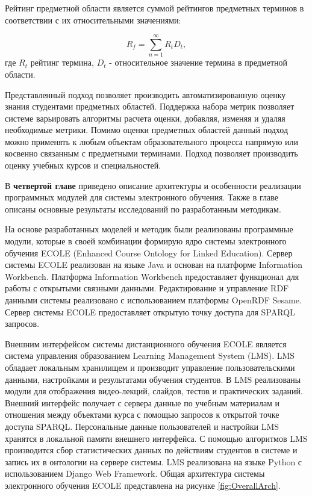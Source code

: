 Рейтинг предметной области является суммой рейтингов предметных терминов в соответствии с их относительными значениями:

$$
    R_f = \sum_{n=1}^{\infty} R_tD_t,
$$
где \(R_t\) рейтинг термина, \(D_t\) - относительное значение термина в предметной области.

Представленный подход позволяет производить автоматизированную оценку знания студентами предметных областей. Поддержка набора метрик позволяет системе варьировать алгоритмы расчета оценки, добавляя, изменяя и удаляя необходимые метрики. Помимо оценки предметных областей данный подход можно применять к любым объектам образовательного процесса напрямую или косвенно связанным с предметными терминами. Подход позволяет производить оценку учебных курсов и специальностей.  

В \textbf{четвертой главе} приведено описание архитектуры и особенности реализации программных модулей для системы электронного обучения. Также в главе описаны основные результаты исследований по разработанным методикам.

На основе разработанных моделей и методик были реализованы программные модули, которые в своей комбинации формирую ядро системы электронного обучения ECOLE (Enhanced Course Ontology for Linked Education). Сервер системы ECOLE реализован на языке Java и основан на платформе Information Workbench. Платформа Information Workbench предоставляет функционал для работы с открытыми связными данными. Редактирование и управление RDF данными системы реализовано с использованием платформы OpenRDF Sesame. Сервер системы ECOLE предоставляет открытую точку доступа для SPARQL запросов. 

Внешним интерфейсом системы дистанционного обучения ECOLE является система управления образованием Learning Management System (LMS). LMS обладает локальным хранилищем и производит управление пользовательскими данными, настройками и результатами обучения студентов. В LMS реализованы модули для отображения видео-лекций, слайдов, тестов и практических заданий. Внешний интерфейс получает с сервера данные по учебным материалам и отношения между объектами курса с помощью запросов к открытой точке доступа SPARQL. Персональные данные пользователей и настройки LMS хранятся в локальной памяти внешнего интерфейса. С помощью алгоритмов LMS производится сбор статистических данных по действиям студентов в системе и запись их в онтологии на сервере системы. LMS реализована на языке Python с использованием Django Web Framework. Общая архитектура системы электронного обучения ECOLE представлена на рисунке \ref{fig:OverallArch}.


